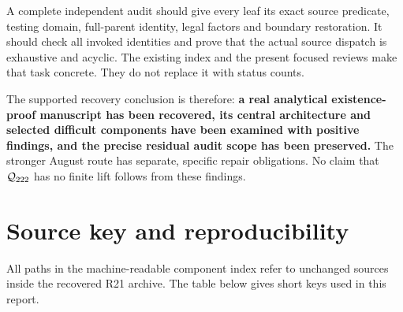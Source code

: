 A complete independent audit should give every leaf its exact source
predicate, testing domain, full-parent identity, legal factors and
boundary restoration. It should check all invoked identities and
prove that the actual source dispatch is exhaustive and acyclic.
The existing index and the present focused reviews make that task
concrete. They do not replace it with status counts.

The supported recovery conclusion is therefore:
\textbf{a real analytical existence-proof manuscript has been recovered,
its central architecture and selected difficult components have been
examined with positive findings, and the precise residual audit scope
has been preserved.} The stronger August route has separate,
specific repair obligations. No claim that \(\mathcal Q_{222}\) has no finite lift
follows from these findings.

\section{Source key and reproducibility}

All paths in the machine-readable component index refer to unchanged
sources inside the recovered R21 archive. The table below gives short
keys used in this report.

